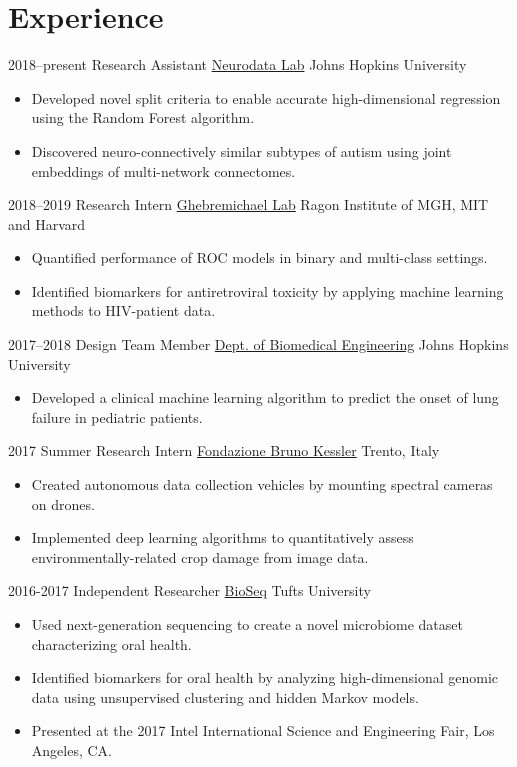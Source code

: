 \section{Experience}

\cventry
{2018--present}
{Research Assistant}
{\href{https://neurodata.io}{Neurodata Lab}}
{Johns Hopkins University}
{}
{
\begin{itemize}
    \item Developed novel split criteria to enable accurate high-dimensional regression using the Random Forest algorithm.
    \item Discovered neuro-connectively similar subtypes of autism using joint embeddings of multi-network connectomes.
\end{itemize}
}

\cventry
{2018--2019}
{Research Intern}
{\href{http://www.ragoninstitute.org/portfolio-item/ghebremichael/}{Ghebremichael Lab}}
{Ragon Institute of MGH, MIT and Harvard}
{}
{
\begin{itemize}
    \item Quantified performance of ROC models in binary and multi-class settings.
    \item Identified biomarkers for antiretroviral toxicity by applying machine learning methods to HIV-patient data.
\end{itemize}{}
}

\cventry
{2017--2018}
{Design Team Member}
{\href{https://cbid.bme.jhu.edu/academics/undergraduate-studies/}{Dept. of Biomedical Engineering}}
{Johns Hopkins University}
{}
{
\begin{itemize}
    \item Developed a clinical machine learning algorithm to predict the onset of lung failure in pediatric patients.
\end{itemize}{}
}

\cventry
{2017}
{Summer Research Intern}
{\href{https://webvalley.fbk.eu}{Fondazione Bruno Kessler}}
{Trento, Italy}
{}
{
\begin{itemize}
    \item Created autonomous data collection vehicles by mounting spectral cameras on drones.
    \item Implemented deep learning algorithms to quantitatively assess environmentally-related crop damage from image data.
\end{itemize}{}
}

\cventry
{2016-2017}
{Independent Researcher}
{\href{http://ase.tufts.edu/chemistry/walt/sepa/index.html}{BioSeq}}
{Tufts University}
{}
{
\begin{itemize}
    \item Used next-generation sequencing to create a novel microbiome dataset characterizing oral health.
    \item Identified biomarkers for oral health by analyzing high-dimensional genomic data using unsupervised clustering and hidden Markov models.
    \item Presented at the 2017 Intel International Science and Engineering Fair, Los Angeles, CA.
\end{itemize}{}
}
